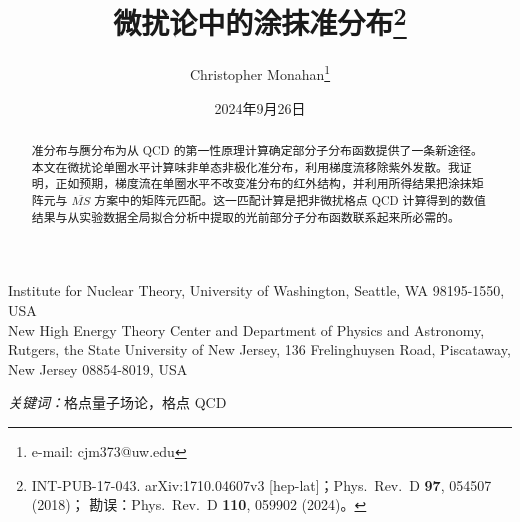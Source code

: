 \documentclass[11pt]{ctexart}
\newcommand{\ms}{\overline{MS}}
\begin{document}
\title{微扰论中的涂抹准分布\thanks{INT-PUB-17-043.
arXiv:1710.04607v3 [hep-lat]；Phys.\ Rev.\ D \textbf{97}, 054507 (2018)；
勘误：Phys.\ Rev.\ D \textbf{110}, 059902 (2024)。}}
\author{Christopher Monahan\thanks{e-mail: cjm373@uw.edu}}
\date{2024年9月26日}
\maketitle

\noindent Institute for Nuclear Theory, University of Washington,
Seattle, WA 98195-1550, USA\\
New High Energy Theory Center and Department of Physics and Astronomy,
Rutgers, the State University of New Jersey,
136 Frelinghuysen Road, Piscataway, New Jersey 08854-8019, USA

\begin{abstract}
准分布与赝分布为从 QCD 的第一性原理计算确定部分子分布函数提供了一条新途径。本文在微扰论单圈水平计算味非单态非极化准分布，利用梯度流移除紫外发散。我证明，正如预期，梯度流在单圈水平不改变准分布的红外结构，并利用所得结果把涂抹矩阵元与 $\ms$ 方案中的矩阵元匹配。这一匹配计算是把非微扰格点 QCD 计算得到的数值结果与从实验数据全局拟合分析中提取的光前部分子分布函数联系起来所必需的。
\end{abstract}

\noindent\textit{关键词：}格点量子场论，格点 QCD







\end{document}
